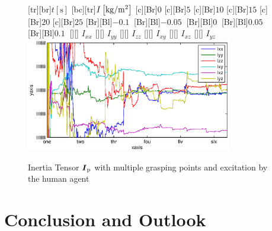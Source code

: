 \begin{figure}
	\centering	
	[tr][br]{$t\left[\mathrm{s}\right]$}
	[bc][tr]{$I\left[\mathrm{kg}/\mathrm{m}^2\right]$}
	[Br]{$0$}
	[Br]{$5$}
	[Br]{$10$}
	[Br]{$15$}
	[Br]{$20$}
	[Br]{$25$}
	[Br][Bl]{$-0.1\  $}
	[Br][Bl]{$-0.05\ $}
	[Br][Bl]{$0\  $}
	[Br][Bl]{$0.05\  $}
	[Br][Bl]{$0.1\  $}
	[][]{\tiny \hspace{0.2cm} $I_{xx}$}
	[][]{\tiny \hspace{0.2cm} $I_{yy}$}
	[][]{\tiny \hspace{0.2cm} $I_{zz}$}
	[][]{\tiny \hspace{0.2cm} $I_{xy}$}
	[][]{\tiny \hspace{0.2cm} $I_{xz}$}
	[][]{\tiny \hspace{0.2cm} $I_{yz}$}
	\includegraphics[width=0.8\textwidth]{figures/multiple_grasping_points_human_inertias.eps}
	\vspace{0.2cm}
	\caption[Inertia errors, multiple grasping points, excitation by human agent]{Inertia Tensor $\boldsymbol{I}_{\mathrm{p}}$ with multiple grasping points and excitation by the human agent}
	\label{fig:estim_inertia_multi_human}
\end{figure}

\chapter{Conclusion and Outlook}

